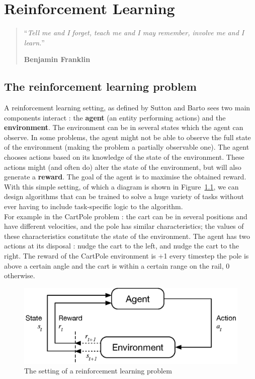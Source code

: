 \chapter{Reinforcement Learning}
\begin{quotation}
\noindent ``\emph{Tell me and I forget, teach me and I may remember, involve me
	and I learn.}''
\begin{flushright}\textbf{Benjamin Franklin}\end{flushright}
\end{quotation}

\vspace*{0.5cm}


\section{The reinforcement learning problem}
A reinforcement learning setting, as defined by Sutton and Barto \cite{suttonbarto}
sees two main components interact : the
\textbf{agent} (an entity performing actions) and the \textbf{environment}. 
The environment can be in several states which the agent
can observe. In some problems, the agent might not be able to observe the
full state of the environment (making the problem a partially observable one).  
The agent chooses actions based on its knowledge of the state of the
environment. These actions might (and often do) alter the state of the
environment, but will also generate a \textbf{reward}.  The
goal of the agent is to maximise the obtained reward.\\

With this simple setting, of which a diagram is shown in Figure~\ref{fig:rl},
we can design algorithms that can be trained to solve a huge variety of tasks
without ever having to include task-specific logic to the algorithm.\\

For example in the CartPole problem : the cart can be in several 
positions and have different velocities, and the pole has similar 
characteristics; the values of these characteristics constitute the state
of the environment. The agent has two actions at its disposal : nudge
the cart to the left, and nudge the cart to the right. 
The reward of the CartPole environment is +1 every timestep the pole is above a 
certain angle and the cart is within a certain range on the rail, 0 otherwise.


\begin{figure}[]
	\centering
	\includegraphics[width=0.65\linewidth]{fig/rl.eps}
	\caption{The setting of a reinforcement learning problem 
		\cite{suttonbarto}}
	\label{fig:rl}
\end{figure}

